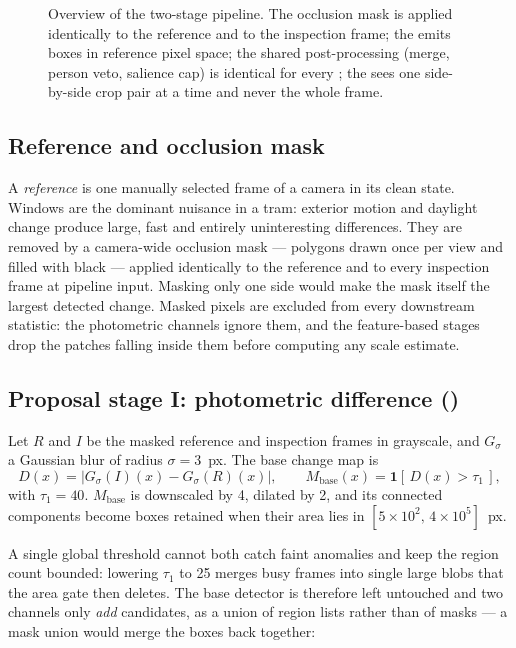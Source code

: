 \begin{figure}[t]
  \centering
  
  \caption{Overview of the two-stage pipeline. The occlusion mask is applied
  identically to the reference and to the inspection frame; the
  \protect\proposer{} emits boxes in reference pixel space; the shared
  post-processing (merge, person veto, salience cap) is identical for every
  \protect\proposer{}; the \protect\judge{} sees one side-by-side crop pair at
  a time and never the whole frame.}
  \label{fig:pipeline}
\end{figure}

\subsection{Reference and occlusion mask}
\label{sec:method:reference}

A \emph{reference} is one manually selected frame of a camera in its clean
state. Windows are the dominant nuisance in a tram: exterior motion and
daylight change produce large, fast and entirely uninteresting differences.
They are removed by a camera-wide occlusion mask --- polygons drawn once per
view and filled with black --- applied identically to the reference and to
every inspection frame at pipeline input. Masking only one side would make the
mask itself the largest detected change. Masked pixels are excluded from every
downstream statistic: the photometric channels ignore them, and the
feature-based stages drop the patches falling inside them before computing any
scale estimate.

\subsection{Proposal stage I: photometric difference (\armphoto)}
\label{sec:method:photo}

Let $R$ and $I$ be the masked reference and inspection frames in grayscale, and
$G_\sigma$ a Gaussian blur of radius $\sigma = 3$~px. The base change map is
%
\begin{equation}
  D(x) = \bigl| G_\sigma(I)(x) - G_\sigma(R)(x) \bigr|,
  \qquad
  M_{\mathrm{base}}(x) = \mathbf{1}\!\left[\, D(x) > \tau_1 \,\right],
  \label{eq:photo}
\end{equation}
%
with $\tau_1 = 40$. $M_{\mathrm{base}}$ is downscaled by 4, dilated by 2, and
its connected components become boxes retained when their area lies in
$[5\times10^{2},\, 4\times10^{5}]$~px.

A single global threshold cannot both catch faint anomalies and keep the region
count bounded: lowering $\tau_1$ to 25 merges busy frames into single large
blobs that the area gate then deletes. The base detector is therefore left
untouched and two channels only \emph{add} candidates, as a union of region
lists rather than of masks --- a mask union would merge the boxes back
together:

